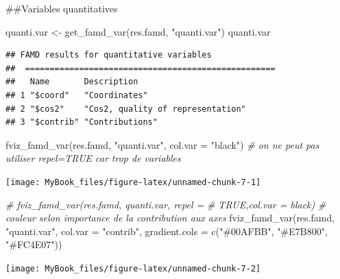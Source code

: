 \documentclass[
  12pt,
  american,
  a4paper,
  extrafontsizes,onecolumn,openright
  ]{memoir}
\newenvironment{Shaded}{\begin{snugshade}}{\end{snugshade}}
\newcommand{\AttributeTok}[1]{\textcolor[rgb]{0.77,0.63,0.00}{#1}}
\newcommand{\CommentTok}[1]{\textcolor[rgb]{0.56,0.35,0.01}{\textit{#1}}}
\newcommand{\FunctionTok}[1]{\textcolor[rgb]{0.00,0.00,0.00}{#1}}
\newcommand{\NormalTok}[1]{#1}
\newcommand{\OtherTok}[1]{\textcolor[rgb]{0.56,0.35,0.01}{#1}}
\newcommand{\StringTok}[1]{\textcolor[rgb]{0.31,0.60,0.02}{#1}}
\begin{document}
\#\#Variables quantitatives

\scriptsize

\begin{Shaded}
\begin{Highlighting}[]
\NormalTok{quanti.var }\OtherTok{\textless{}{-}} \FunctionTok{get\_famd\_var}\NormalTok{(res.famd, }\StringTok{"quanti.var"}\NormalTok{)}
\NormalTok{quanti.var}
\end{Highlighting}
\end{Shaded}

\begin{verbatim}
## FAMD results for quantitative variables 
##  ===================================================
##   Name       Description                      
## 1 "$coord"   "Coordinates"                    
## 2 "$cos2"    "Cos2, quality of representation"
## 3 "$contrib" "Contributions"
\end{verbatim}

\begin{Shaded}
\begin{Highlighting}[]
\FunctionTok{fviz\_famd\_var}\NormalTok{(res.famd, }\StringTok{"quanti.var"}\NormalTok{, }\AttributeTok{col.var =} \StringTok{"black"}\NormalTok{)  }\CommentTok{\# on ne peut pas utiliser repel=TRUE car trop de variables}
\end{Highlighting}
\end{Shaded}

\begin{center}\texttt{[image: MyBook\_files/figure-latex/unnamed-chunk-7-1]} \end{center}

\begin{Shaded}
\begin{Highlighting}[]
\CommentTok{\# fviz\_famd\_var(res.famd, \textquotesingle{}quanti.var\textquotesingle{}, repel =}
\CommentTok{\# TRUE,col.var = \textquotesingle{}black\textquotesingle{})}
\CommentTok{\# couleur selon importance de la contribution aux axes}
\FunctionTok{fviz\_famd\_var}\NormalTok{(res.famd, }\StringTok{"quanti.var"}\NormalTok{, }\AttributeTok{col.var =} \StringTok{"contrib"}\NormalTok{, }\AttributeTok{gradient.cols =} \FunctionTok{c}\NormalTok{(}\StringTok{"\#00AFBB"}\NormalTok{,}
    \StringTok{"\#E7B800"}\NormalTok{, }\StringTok{"\#FC4E07"}\NormalTok{))}
\end{Highlighting}
\end{Shaded}

\begin{center}\texttt{[image: MyBook\_files/figure-latex/unnamed-chunk-7-2]} \end{center}
\end{document}
